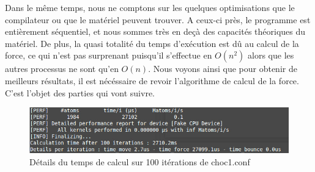 Dans le même temps, nous ne comptons sur les quelques optimisations que le compilateur ou que le matériel peuvent trouver. A ceux-ci près, le programme est entièrement séquentiel, et nous sommes très en deçà des capacités théoriques du matériel.
De plus, la quasi totalité du temps d'exécution est dû au calcul de la force, ce qui n'est pas surprenant puisqu'il s'effectue en $O(n^2)$ alors que les autres processus ne sont qu'en $O(n)$.
Nous voyons ainsi que pour obtenir de meilleurs résultats, il est nécéssaire de revoir l'algorithme de calcul de la force. C'est l'objet des parties qui vont suivre.

\begin{figure}[!h]
    \centering
    \includegraphics[scale=0.4]{./img/seqtime.jpg}
    \caption{Détails du temps de calcul sur 100 itérations de choc1.conf}
\end{figure}